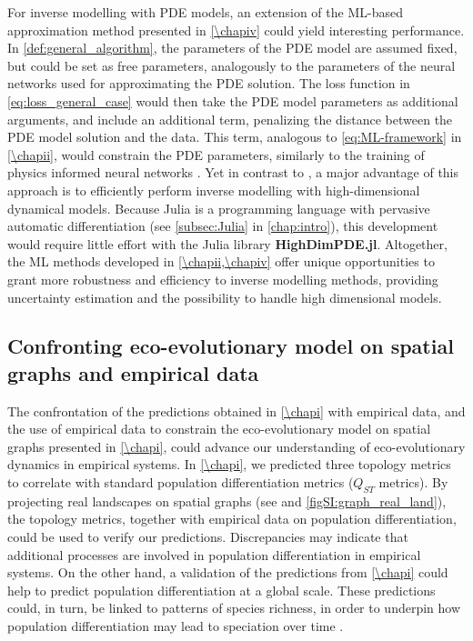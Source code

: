 For inverse modelling with PDE models, an extension of the ML-based approximation method presented in \cref{\chapiv} could yield interesting performance.
% 
In \cref{def:general_algorithm}, the parameters of the PDE model are assumed fixed, but could be set as free parameters, analogously to the parameters of the neural networks used for approximating the PDE solution. The loss function in \cref{eq:loss_general_case} would then take the PDE model parameters as additional arguments, and include an additional term, penalizing the distance between the PDE model solution and the data. This term, analogous to \cref{eq:ML-framework} in \cref{\chapii}, would constrain the PDE parameters, similarly to the training of physics informed neural networks \citep{Raissi2019,Yazdani2020}.
% 
Yet in contrast to \cite{Raissi2019,Yazdani2020}, a major advantage of this approach is to efficiently perform inverse modelling with high-dimensional dynamical models. Because Julia is a programming language with pervasive automatic differentiation (see \cref{subsec:Julia} in \cref{chap:intro}), this development would require little effort with the Julia library \textbf{HighDimPDE.jl}.
% 
Altogether, the ML methods developed in \cref{\chapii,\chapiv} offer unique opportunities to grant more robustness and efficiency to inverse modelling methods, providing uncertainty estimation and the possibility to handle high dimensional models.


\subsection{Confronting eco-evolutionary model on spatial graphs and empirical data}

The confrontation of the predictions obtained in \cref{\chapi} with empirical data, and the use of empirical data to constrain the eco-evolutionary model on spatial graphs presented in \cref{\chapi}, could advance our understanding of eco-evolutionary dynamics in empirical systems.
% 
In \cref{\chapi}, we predicted three topology metrics to correlate with standard population differentiation metrics ($Q_{ST}$ metrics). By projecting real landscapes on spatial graphs (see \cite{Dale2010} and \cref{figSI:graph_real_land}), the topology metrics, together with empirical data on population differentiation, could be used to verify our predictions. Discrepancies may indicate that additional processes are involved in population differentiation in empirical systems. On the other hand, a validation of the predictions from \cref{\chapi} could help to predict population differentiation at a global scale. These predictions could, in turn, be linked to patterns of species richness, in order to underpin how population differentiation may lead to speciation over time \citep{Templeton1981}.

